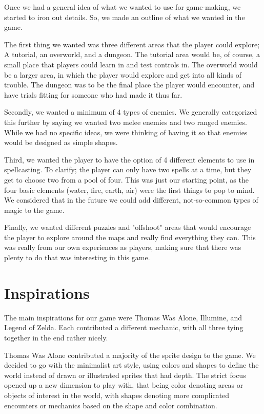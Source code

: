 \documentclass{sigchi}
\begin{document}
Once we had a general idea of what we wanted to use for game-making, we started to iron out details. So, we made an outline of what we wanted in the game.

The first thing we wanted was three different areas that the player could explore; A tutorial, an overworld, and a dungeon. The tutorial area would be, of course,
a small place that players could learn in and test controls in. The overworld would be a larger area, in which the player would explore and get into all kinds of
trouble. The dungeon was to be the final place the player would encounter, and have trials fitting for someone who had made it thus far.

Secondly, we wanted a minimum of 4 types of enemies. We generally categorized this further by saying we wanted two melee enemies and two ranged enemies. While
we had no specific ideas, we were thinking of having it so that enemies would be designed as simple shapes.

Third, we wanted the player to have the option of 4 different elements to use in spellcasting. To clarify; the player can only have two spells at a time, but they
get to choose two from a pool of four. This was just our starting point, as the four basic elements (water, fire, earth, air) were the first things to pop to mind.
We considered that in the future we could add different, not-so-common types of magic to the game.

Finally, we wanted different puzzles and "offshoot" areas that would encourage the player to explore around the maps and really find everything they can. This was
really from our own experiences as players, making sure that there was plenty to do that was interesting in this game.

\newpage

\section{Inspirations}
The main inspirations for our game were Thomas Was Alone, Illumine, and Legend of Zelda.  Each contributed a different mechanic, with all three tying together in the end rather nicely.

Thomas Was Alone contributed a majority of the sprite design to the game.  We decided to go with the minimalist art style, using colors and shapes to define the world instead of
drawn or illustrated sprites that had depth.  The strict focus opened up a new dimension to play with, that being color denoting areas or objects of interest in the world, with shapes denoting more 
complicated encounters or mechanics based on the shape and color combination.
\end{document}
